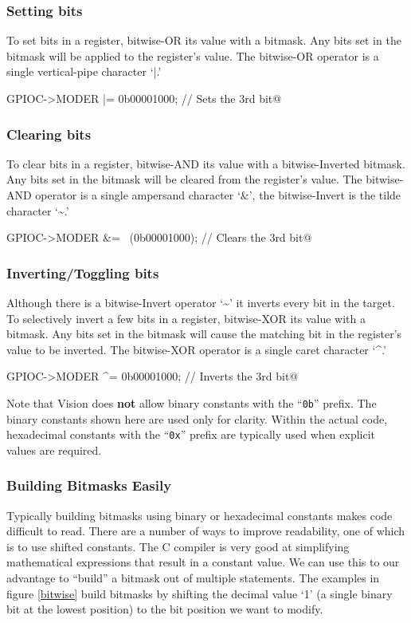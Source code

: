 \documentclass[11pt,fleqn]{book} %
\makeatletter
\newcommand{\ilcode}[1]{
    \smallskip
    \colorbox{gray!20!white}{
        \centering
        \parbox{\linewidth-2\fboxsep}{
            \lstinline@#1@
        }
    }
}
\makeatother
\begin{document}
\subsubsection{Setting bits}
To set bits in a register, bitwise-OR its value with a bitmask. Any bits set in the bitmask will be applied to the register's value. The bitwise-OR operator is a single vertical-pipe character `|.'

\ilcode{GPIOC->MODER |= 0b00001000;    // Sets the 3rd bit}%

\subsubsection{Clearing bits}
To clear bits in a register, bitwise-AND its value with a bitwise-Inverted bitmask. Any bits set in the bitmask will be cleared from the register's value. The bitwise-AND operator is a single ampersand character `\&', the bitwise-Invert is the tilde character `\textasciitilde.'

\ilcode{GPIOC->MODER \&= ~(0b00001000);    // Clears the 3rd bit}%

\subsubsection{Inverting/Toggling bits}
Although there is a bitwise-Invert operator `\textasciitilde' it inverts every bit in the target. To selectively invert a few bits in a register, bitwise-XOR its value with a bitmask. Any bits set in the bitmask will cause the matching bit in the register's value to be inverted. The bitwise-XOR operator is a single caret character `\textasciicircum.'

\ilcode{GPIOC->MODER ^= 0b00001000;    // Inverts the 3rd bit}%

\begin{warning}
    Note that {\textmu}Vision does \textbf{not} allow binary constants with the ``\texttt{0b}'' prefix. The binary constants shown here are used only for clarity. Within the actual code, hexadecimal constants with the ``\texttt{0x}'' prefix are typically used when explicit values are required.  
\end{warning}

\subsubsection{Building Bitmasks Easily}

Typically building bitmasks using binary or hexadecimal constants makes code difficult to read. There are a number of ways to improve readability, one of which is to use shifted constants. The C compiler is very good at simplifying mathematical expressions that result in a constant value. We can use this to our advantage to ``build'' a bitmask out of multiple statements. The examples in figure \ref{bitwise} build bitmasks by shifting the decimal value `1' (a single binary bit at the lowest position) to the bit position we want to modify.
\end{document}
